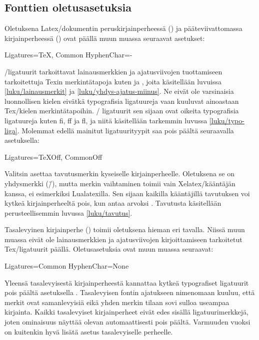 \subsection{Fonttien oletusasetuksia}
\label{luku/fontit-oletusasetukset}

Oletuksena Latex\-/dokumentin peruskirjainperheessä
() ja pääteviivattomassa kirjainperheessä
() ovat päällä muun muassa seuraavat asetukset:%

\begin{koodilohkosis}
Ligatures={TeX, Common}
HyphenChar=-
\end{koodilohkosis}

\noindent
{}\-/ligatuurit tarkoittavat lainausmerkkien ja ajatusviivojen
tuottamiseen tarkoitettuja Texin merkintätapoja kuten  ja
\koodi{\==}, joita käsitellään luvuissa \ref{luku/lainausmerkit} ja
\ref{luku/yhdys-ajatus-miinus}. Ne eivät ole varsinaisia luonnollisen
kielen eivätkä typografisia ligatuureja vaan kuuluvat ainoastaan
Tex\-/kielen merkintätapoihin. \-/ ligatuurit sen sijaan
ovat oikeita typografisia ligatuureja kuten fi, ff ja fl, ja niitä
käsitellään tarkemmin luvussa \ref{luku/typo-liga}. Molemmat edellä
mainitut ligatuurityypit saa pois päältä seuraavalla asetuksella:

\begin{koodilohkosis}
Ligatures={TeXOff, CommonOff}
\end{koodilohkosis}

\noindent
Valitsin  asettaa tavutusmerkin kyseiselle
kirjainperheelle. Oletuksena se on yhdysmerkki (\=/), mutta merkin
vaihtaminen toimii vain Xelatex\-/kääntäjän kanssa, ei esimerkiksi
Lualatexilla. Sen sijaan kaikilla kääntäjillä tavutuksen voi kytkeä
kirjainperheeltä pois, kun antaa arvoksi . Tavutusta
käsitellään perusteellisemmin luvussa \ref{luku/tavutus}.

Tasalevyinen kirjainperhe () toimii oletuksena
hieman eri tavalla. Niissä muun muassa eivät ole lainausmerkkien ja
ajatusviivojen kirjoittamiseen tarkoitetut Tex\-/ligatuurit päällä.
Oletusasetuksia ovat muun muassa seuraavat:

\begin{koodilohkosis}
Ligatures=Common
HyphenChar=None
\end{koodilohkosis}

\noindent
Yleensä tasalevyisestä kirjainperheestä kannattaa kytkeä typografiset
ligatuurit pois päältä asetuksella . Tasalevyisen fontin ajatukseen nimenomaan kuuluu, että
merkit ovat samanlevyisiä eikä yhden merkin tilaan sovi sulloa useampaa
kirjainta. Kaikki tasalevyiset kirjainperheet eivät edes sisällä
ligatuurimerkkejä, joten ominaisuus näyttää olevan automaattisesti pois
päältä. Varmuuden vuoksi on kuitenkin hyvä lisätä asetus
 tasalevyiselle perheelle.


